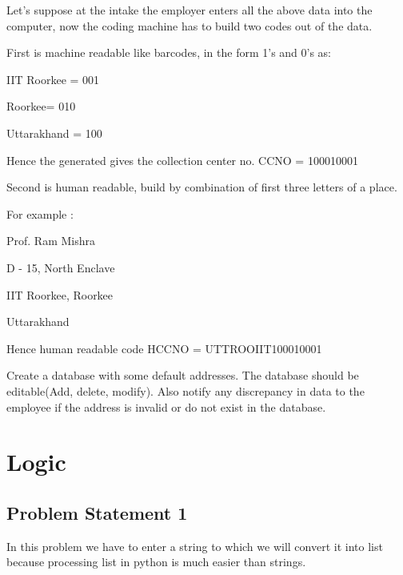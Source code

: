 \documentclass[10pt]{article}
\begin{document}
Let's suppose at the intake the employer enters all the above data into the computer, now the coding machine has to build two codes out of the data.

First is machine readable like barcodes, in the form 1’s and 0’s as:



IIT Roorkee  = 001



Roorkee= 010



Uttarakhand = 100



Hence the generated gives the collection center no. CCNO = 100010001





Second is human readable, build by combination of first three letters of a place.



For example :



Prof. Ram Mishra



D - 15, North Enclave



IIT Roorkee, Roorkee


Uttarakhand

Hence human readable code HCCNO =  UTTROOIIT100010001








Create a database with some default addresses.
The database should be editable(Add, delete, modify).
Also notify any discrepancy in data to the employee if the address is invalid or do not exist in the database.


\newpage




\pagebreak
\section{Logic}

\subsection{Problem Statement 1}

In this problem we have to enter a string to which we will convert it into list because processing list in python is much easier than strings.
\end{document}
